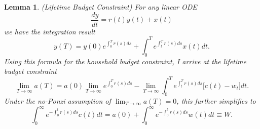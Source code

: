 \documentclass[11pt]{extarticle}
\theoremstyle{plain}
\newtheorem{lem}[thm]{Lemma}
\theoremstyle{definition}
\begin{document}
\vspace{3mm}
\noindent
\begin{lem} (Lifetime Budget Constraint) For any linear ODE 
	\begin{equation*}
		\frac{dy}{dt} = r(t) y(t) + x(t)
	\end{equation*}
	we have the integration result 
	\begin{equation*}
		y(T)  = y(0) e^{\int_0^T r(s) ds} +  \int_0^T e^{\int_t^T r(s) ds }  x(t) dt.
	\end{equation*}
	Using this formula for the household budget constraint, I arrive at the lifetime budget constraint 
	\begin{equation*}
		\lim_{T \to \infty} a(T)  = a(0) \lim_{T \to \infty} e^{\int_0^T r(s) ds} -  \lim_{T \to \infty} \int_0^T e^{\int_t^T r(s) ds } \Big[ c(t) - w_t \Big] dt.
	\end{equation*}
	Under the no-Ponzi assumption of $\lim_{T \to \infty} a(T) = 0$, this further simplifies to 
	\begin{equation*}
		\int_0^\infty e^{- \int_0^t r(s) ds }   c(t) dt = a(0) + \int_0^\infty e^{- \int_0^t r(s) ds }   w(t) dt \equiv W.
	\end{equation*}
\end{lem}
\end{document}
